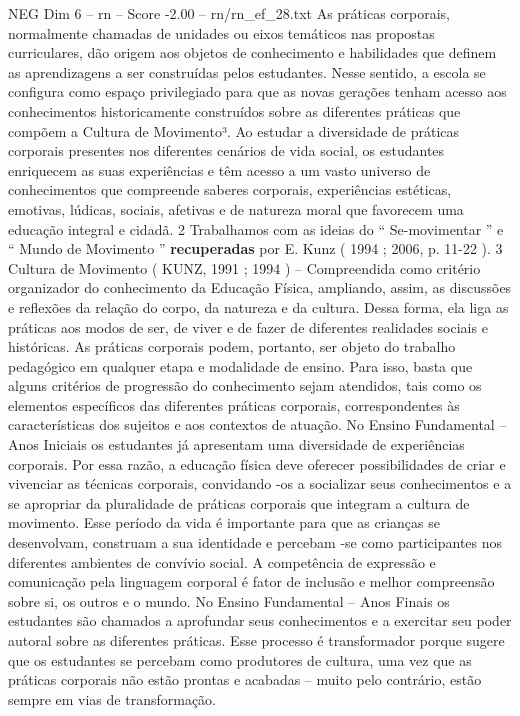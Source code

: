 \begin{textsample}{NEG Dim 6 – rn – Score -2.00 – rn/rn\_ef\_28.txt}  \label{ex:f6_neg_051}
As práticas corporais, normalmente chamadas de unidades ou eixos temáticos nas propostas curriculares, dão origem aos objetos de conhecimento e habilidades que definem as aprendizagens a ser construídas pelos estudantes.
Nesse sentido, a escola se configura como espaço privilegiado para que as novas gerações tenham acesso aos conhecimentos historicamente construídos sobre as diferentes práticas que compõem a Cultura de Movimento³.
Ao estudar a diversidade de práticas corporais presentes nos diferentes cenários de vida social, os estudantes enriquecem as suas experiências e têm acesso a um vasto universo de conhecimentos que compreende saberes corporais, experiências estéticas, emotivas, lúdicas, sociais, afetivas e de natureza moral que favorecem uma educação integral e cidadã. 2 Trabalhamos com as ideias do “ Se-movimentar ” e “ Mundo de Movimento ” \textbf{recuperadas} por E.
Kunz ( 1994 ; 2006, p. 11-22 ). 3 Cultura de Movimento ( KUNZ, 1991 ; 1994 ) – Compreendida como critério organizador do conhecimento da Educação Física, ampliando, assim, as discussões e reflexões da relação do corpo, da natureza e da cultura.
Dessa forma, ela liga as práticas aos modos de ser, de viver e de fazer de diferentes realidades sociais e históricas.
As práticas corporais podem, portanto, ser objeto do trabalho pedagógico em qualquer etapa e modalidade de ensino.
Para isso, basta que alguns critérios de progressão do conhecimento sejam atendidos, tais como os elementos específicos das diferentes práticas corporais, correspondentes às características dos sujeitos e aos contextos de atuação.
No Ensino Fundamental – Anos Iniciais os estudantes já apresentam uma diversidade de experiências corporais.
Por essa razão, a educação física deve oferecer possibilidades de criar e vivenciar as técnicas corporais, convidando -os a socializar seus conhecimentos e a se apropriar da pluralidade de práticas corporais que integram a cultura de movimento.
Esse período da vida é importante para que as crianças se desenvolvam, construam a sua identidade e percebam -se como participantes nos diferentes ambientes de convívio social.
A competência de expressão e comunicação pela linguagem corporal é fator de inclusão e melhor compreensão sobre si, os outros e o mundo.
No Ensino Fundamental – Anos Finais os estudantes são chamados a aprofundar seus conhecimentos e a exercitar seu poder autoral sobre as diferentes práticas.
Esse processo é transformador porque sugere que os estudantes se percebam como produtores de cultura, uma vez que as práticas corporais não estão prontas e acabadas – muito pelo contrário, estão sempre em vias de transformação.

\end{textsample}
